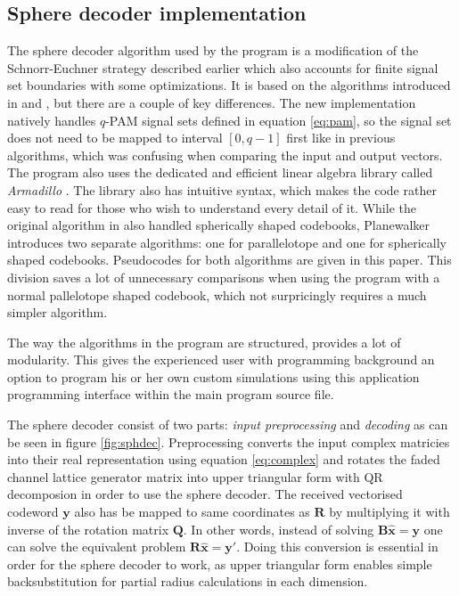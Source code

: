 \documentclass[english,12pt,a4paper,pdftex,sci,utf8]{aaltothesis}
\begin{document}
\subsection{Sphere decoder implementation}
\label{sec:sphdec}
The sphere decoder algorithm used by the program is a modification of the Schnorr-Euchner strategy described earlier which also accounts for finite signal set boundaries with some optimizations. It is based on the algorithms introduced in \cite{mia} and \cite{ranto}, but there are a couple of key differences. The new implementation natively handles $q$-PAM signal sets defined in equation \eqref{eq:pam}, so the signal set does not need to be mapped to interval $[0,q-1]$ first like in previous algorithms, which was confusing when comparing the input and output vectors. The program also uses the dedicated and efficient linear algebra library called \emph{Armadillo} \cite{arma}. The library also has intuitive syntax, which makes the code rather easy to read for those who wish to understand every detail of it. While the original algorithm in \cite{ranto} also handled spherically shaped codebooks, Planewalker introduces two separate algorithms: one for parallelotope and one for spherically shaped codebooks. Pseudocodes for both algorithms are given in this paper. This division saves a lot of unnecessary comparisons when using the program with a normal pallelotope shaped codebook, which not surpricingly requires a much simpler algorithm. 
\par The way the algorithms in the program are structured, provides a lot of modularity. This gives the experienced user with programming background an option to program his or her own custom simulations using this application programming interface within the main program source file.
\par The sphere decoder consist of two parts: \emph{input preprocessing} and \emph{decoding} as can be seen in figure \ref{fig:sphdec}. Preprocessing converts the input complex matricies into their real representation using equation \eqref{eq:complex} and rotates the faded channel lattice generator matrix into upper triangular form with QR decomposion in order to use the sphere decoder. The received vectorised codeword $\textbf{y}$ also has be mapped to same coordinates as $\textbf{R}$ by multiplying it with inverse of the rotation matrix $\textbf{Q}$. In other words, instead of solving $\mathbf{B\hat{x}}=\mathbf{y}$ one can solve the equivalent problem $\mathbf{R\hat{x}}=\mathbf{y'}$. Doing this conversion is essential in order for the sphere decoder to work, as upper triangular form enables simple backsubstitution for partial radius calculations in each dimension. 
\end{document}
